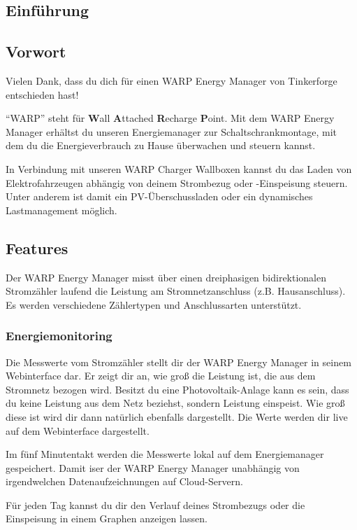 \documentclass[a4paper,10pt]{article}
\begin{document}
\begin{multicols*}{2}
	\tableofcontents
	\newpage
	\section{Einführung}
	\subsection{Vorwort} Vielen Dank, dass du
	dich für einen WARP Energy Manager von Tinkerforge entschieden hast!

	\enquote{WARP} steht
	für \textbf{W}all \textbf{A}ttached
	\textbf{R}echarge \textbf{P}oint. Mit dem WARP Energy Manager
	erhältst du unseren Energiemanager zur Schaltschrankmontage, mit dem du die
	Energieverbrauch zu Hause überwachen und steuern kannst. 

	In Verbindung mit unseren WARP Charger Wallboxen kannst du das Laden von
	Elektrofahrzeugen abhängig von deinem Strombezug oder -Einspeisung steuern.
	Unter anderem ist damit ein PV-Überschussladen oder ein dynamisches
	Lastmanagement möglich.

	\subsection{Features}
	\vspace{-0.1cm}
	Der WARP Energy Manager misst über einen dreiphasigen bidirektionalen 
	Stromzähler laufend die Leistung am Stromnetzanschluss (z.B. Hausanschluss).
	Es werden verschiedene Zählertypen und Anschlussarten unterstützt.

	\subsubsection{Energiemonitoring}
	Die Messwerte vom Stromzähler stellt dir der WARP Energy Manager in seinem
	Webinterface dar. Er zeigt dir an, wie groß die Leistung ist, die aus dem Stromnetz
	bezogen wird. Besitzt du eine Photovoltaik-Anlage kann es sein, dass du
	keine Leistung aus dem Netz beziehst, sondern Leistung einspeist. 
	Wie groß diese ist wird dir dann natürlich ebenfalls dargestellt. Die Werte
	werden dir live auf dem Webinterface dargestellt.

	Im fünf Minutentakt werden die Messwerte lokal auf dem 
	Energiemanager gespeichert. Damit iser der WARP Energy Manager unabhängig 
	von irgendwelchen Datenaufzeichnungen auf Cloud-Servern.

	Für jeden Tag kannst du dir den Verlauf deines Strombezugs oder die
	Einspeisung in einem Graphen anzeigen lassen.


\end{multicols*}
\end{document}
